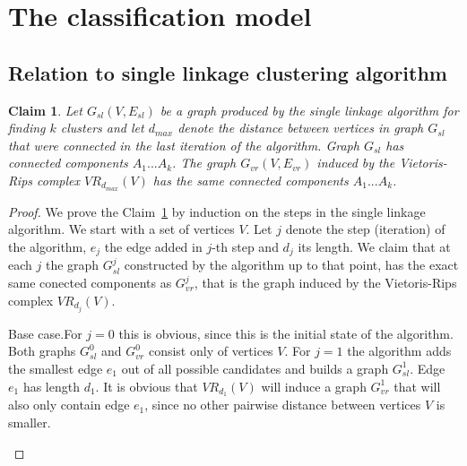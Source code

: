 \documentclass{article}
\newcommand{\enterProblemHeader}[1]{
}
\newcommand{\exitProblemHeader}[1]{
}
\newcounter{homeworkProblemCounter} %
\newcommand{\homeworkProblemName}{}
\newenvironment{homeworkProblem}[1][Problem \arabic{homeworkProblemCounter}]{ %
\stepcounter{homeworkProblemCounter} %
\renewcommand{\homeworkProblemName}{#1} %
\section{\homeworkProblemName} %
\enterProblemHeader{\homeworkProblemName} %
}{
\exitProblemHeader{\homeworkProblemName} %
}
\newcommand{\homeworkSectionName}{}
\newenvironment{homeworkSection}[1]{ %
\renewcommand{\homeworkSectionName}{#1} %
\subsection{\homeworkSectionName} %
\enterProblemHeader{\homeworkProblemName\ [\homeworkSectionName]} %
}{
\enterProblemHeader{\homeworkProblemName} %
}
\newtheorem{claim}{Claim}
\begin{document}
\begin{homeworkProblem}[The classification model]
\begin{homeworkSection}{Relation to single linkage clustering algorithm}
\begin{claim}\label{claima}
Let $G_{sl}(V, E_{sl})$ be a graph produced by the single linkage algorithm for finding $k$ clusters and let $d_{max}$ denote the distance between vertices in graph $G_{sl}$ that were connected in the last iteration of the algorithm. Graph $G_{sl}$ has connected components $A_{1}...A_{k}$. The graph $G_{vr}(V, E_{vr})$ induced by the Vietoris-Rips complex $VR_{d_{max}}(V)$ has the same connected components $A_{1}...A_{k}$.
\end{claim}

\begin{proof}
\label{theproof}
We prove the Claim~\ref{claima} by induction on the steps in the single linkage algorithm. We start with a set of vertices $V$. Let $j$ denote the step (iteration) of the algorithm, $e_{j}$ the edge added in $j$-th step and $d_{j}$ its length. We claim that at each $j$ the graph $G_{sl}^{j}$ constructed by the algorithm up to that point, has the exact same conected components as $G_{vr}^{j}$, that is the graph induced by the Vietoris-Rips complex $VR_{d_{j}}(V)$.

\begin{paragraph}{Base case.}For $j=0$ this is obvious, since this is the initial state of the algorithm. Both graphs $G_{sl}^{0}$ and $G_{vr}^{0}$ consist only of vertices $V$. For $j=1$ the algorithm adds the smallest edge $e_{1}$ out of all possible candidates and builds a graph $G_{sl}^{1}$. Edge $e_{1}$ has length $d_{1}$. It is obvious that $VR_{d_{1}}(V)$ will induce a graph $G_{vr}^{1}$ that will also only contain edge $e_{1}$, since no other pairwise distance between vertices $V$ is smaller.
\end{paragraph}


\end{proof}
\end{homeworkSection}
\end{homeworkProblem}
\end{document}
